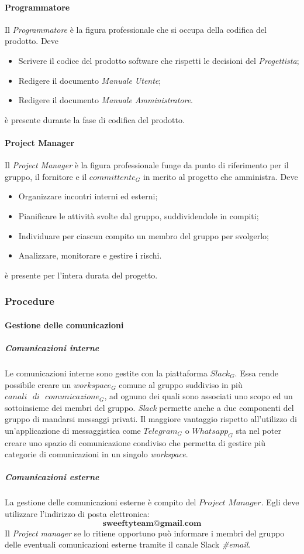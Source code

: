 		\paragraph{Programmatore} \Spazio
		Il \emph{Programmatore} è la figura professionale che si occupa della codifica del prodotto. Deve
		\begin{itemize}
			\item Scrivere il codice  del prodotto software che rispetti le decisioni del \emph{Progettista};
			\item Redigere il documento \emph{Manuale Utente};
			\item Redigere il documento \emph{Manuale Amministratore}.
		\end{itemize}
		è presente durante la fase di codifica del prodotto.
		\paragraph{Project Manager} \Spazio
		Il \emph{Project Manager} è la figura professionale funge da punto di riferimento per il gruppo, il fornitore e il $committente_G$ in merito al progetto che amministra. Deve
		\begin{itemize}
			\item Organizzare incontri interni ed esterni;
			\item Pianificare le attività svolte dal gruppo, suddividendole in compiti;
			\item Individuare per ciascun compito un membro del gruppo per svolgerlo;
			\item Analizzare, monitorare e gestire i rischi.
		\end{itemize}
		è presente per l'intera durata del progetto.
	\subsubsection{Procedure}
		\paragraph{Gestione delle comunicazioni}
			\subparagraph{Comunicazioni interne} \Spazio
			\label{comInterne}
			Le comunicazioni interne sono gestite con la piattaforma $Slack_G$. Essa rende possibile creare un $workspace_G$ comune al gruppo suddiviso in più $canali \text{ } di \text{ } comunicazione_G$, ad ognuno dei quali sono associati uno scopo ed un sottoinsieme dei membri del gruppo. \emph{Slack} permette anche a due componenti del gruppo di mandarsi messaggi privati. Il maggiore vantaggio rispetto all'utilizzo di un'applicazione di messaggistica come $Telegram_G$ o $Whatsapp_G$ sta nel poter creare uno spazio di comunicazione condiviso che permetta di gestire più categorie di comunicazioni in un singolo \emph{workspace}. %
			\subparagraph{Comunicazioni esterne} \Spazio
			 La gestione delle comunicazioni esterne è compito del $Project$ $Manager$. Egli deve utilizzare l'indirizzo di posta elettronica:
			$$\textbf{sweeftyteam@gmail.com}$$
			Il \emph{Project manager} se lo ritiene opportuno può informare i membri del gruppo delle eventuali comunicazioni esterne tramite il canale Slack \emph{\#email}.
			
